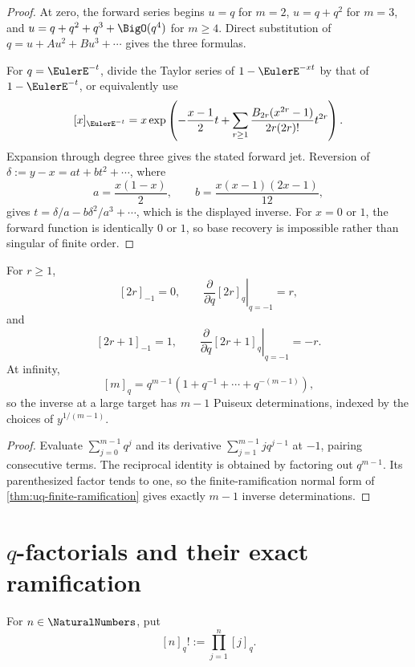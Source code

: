 \begin{proof}
At zero, the forward series begins \(u=q\) for \(m=2\),
\(u=q+q^2\) for \(m=3\), and \(u=q+q^2+q^3+\BigO(q^4)\) for
\(m\ge4\).  Direct substitution of
\(q=u+Au^2+Bu^3+\cdots\) gives the three formulas.

For \(q=\EulerE^{-t}\), divide the Taylor series of
\(1-\EulerE^{-xt}\) by that of \(1-\EulerE^{-t}\), or equivalently use
\[
  [x]_{\EulerE^{-t}}
  =x\exp\left(
    -\frac{x-1}{2}t+
    \sum_{r\ge1}
    \frac{B_{2r}(x^{2r}-1)}{2r(2r)!}t^{2r}
  \right).
\]
Expansion through degree three gives the stated forward jet.  Reversion of
\(\delta:=y-x=a t+b t^2+\cdots\), where
\[
  a=\frac{x(1-x)}2,\qquad
  b=\frac{x(x-1)(2x-1)}{12},
\]
gives \(t=\delta/a-b\delta^2/a^3+\cdots\), which is the displayed inverse.
For \(x=0\) or \(1\), the forward function is identically \(0\) or \(1\), so
base recovery is impossible rather than singular of finite order.
\end{proof}

\begin{proposition}
\label{prop:qs-qnumber-alternating}
For \(r\ge1\),
\[
  [2r]_{-1}=0,\qquad
  \left.\frac{\partial}{\partial q}[2r]_q\right|_{q=-1}=r,
\]
and
\[
  [2r+1]_{-1}=1,\qquad
  \left.\frac{\partial}{\partial q}[2r+1]_q\right|_{q=-1}=-r.
\]
At infinity,
\[
  [m]_q=q^{m-1}(1+q^{-1}+\cdots+q^{-(m-1)}),
\]
so the inverse at a large target has \(m-1\) Puiseux determinations, indexed
by the choices of \(y^{1/(m-1)}\).
\end{proposition}

\begin{proof}
Evaluate \(\sum_{j=0}^{m-1}q^j\) and its derivative
\(\sum_{j=1}^{m-1}jq^{j-1}\) at \(-1\), pairing consecutive terms.
The reciprocal identity is obtained by factoring out \(q^{m-1}\).  Its
parenthesized factor tends to one, so the finite-ramification normal form of
\cref{thm:uq-finite-ramification} gives exactly \(m-1\) inverse
determinations.
\end{proof}

\section{\texorpdfstring{\(q\)-factorials and their exact ramification}{q-factorials and their exact ramification}}
\label{sec:qs-qfactorials}

For \(n\in\NaturalNumbers\), put
\[
  [n]_q!:=\prod_{j=1}^{n}[j]_q.
\]

